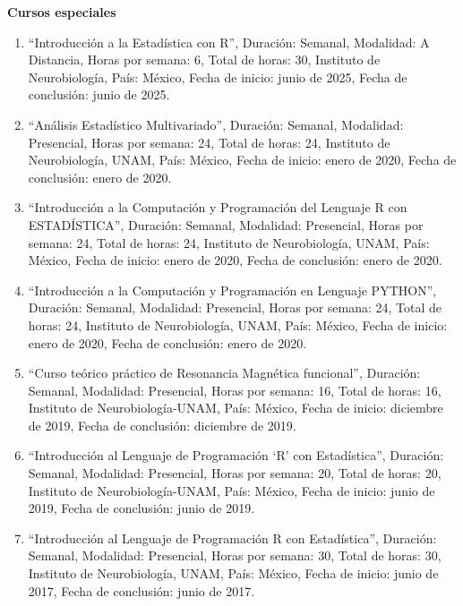 {\large \textbf{Cursos especiales}}

\hrulefill

\begin{enumerate}

\item “Introducción a la Estadística con R”, Duración: Semanal, Modalidad: A Distancia, Horas por semana: 6, 
Total 
de horas: 30, Instituto de Neurobiología, País: México, Fecha de inicio: junio de 2025, Fecha de conclusión: 
junio de 2025.

\item “Análisis Estadístico Multivariado”, Duración: Semanal, Modalidad: Presencial, Horas por semana: 24, 
Total de 
horas: 24, Instituto de Neurobiología, UNAM, País: México, Fecha de inicio: enero de 2020, Fecha de 
conclusión: enero de 2020.

\item “Introducción a la Computación y Programación del Lenguaje R con ESTADÍSTICA”, Duración: Semanal, 
Modalidad: 
Presencial, Horas por semana: 24, Total de horas: 24, Instituto de Neurobiología, UNAM, País: México, Fecha de 
inicio: enero de 2020, Fecha de conclusión: enero de 2020.

\item “Introducción a la Computación y Programación en Lenguaje PYTHON”, Duración: Semanal, Modalidad: 
Presencial, 
Horas por semana: 24, Total de horas: 24, Instituto de Neurobiología, UNAM, País: México, Fecha de inicio: 
enero de 2020, Fecha de conclusión: enero de 2020.

\item “Curso teórico práctico de Resonancia Magnética funcional”, Duración: Semanal, Modalidad: Presencial, 
Horas 
por semana: 16, Total de horas: 16, Instituto de Neurobiología-UNAM, País: México, Fecha de inicio: diciembre 
de 2019, Fecha de conclusión: diciembre de 2019.

\item “Introducción al Lenguaje de Programación ‘R’ con Estadística”, Duración: Semanal, Modalidad: 
Presencial, 
Horas por semana: 20, Total de horas: 20, Instituto de Neurobiología-UNAM, País: México, Fecha de inicio: 
junio de 2019, Fecha de conclusión: junio de 2019.

\item “Introducción al Lenguaje de Programación R con Estadística”, Duración: Semanal, Modalidad: Presencial, 
Horas 
por semana: 30, Total de horas: 30, Instituto de Neurobiología, UNAM, País: México, Fecha de inicio: junio de 
2017, Fecha de conclusión: junio de 2017.


\end{enumerate}
